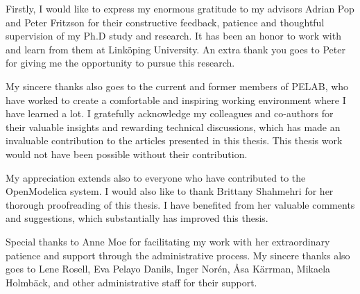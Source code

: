 

Firstly, I would like to express my enormous gratitude to my advisors Adrian Pop and Peter Fritzson for their 
constructive feedback, patience and thoughtful supervision of my Ph.D study and research. It has been an honor to work with 
and learn from them at Linköping University. An extra thank you goes to Peter for giving me the opportunity to pursue this research.

My sincere thanks also goes to the current and former members of PELAB, who have worked to create a comfortable and inspiring working environment where I have learned a lot.
I gratefully acknowledge my colleagues and co-authors for their valuable insights and rewarding technical discussions, which has made an invaluable contribution to the articles 
presented in this thesis. This thesis work would not have been possible without their contribution.

My appreciation extends also to everyone who have contributed to the OpenModelica system. I would also like to thank Brittany Shahmehri for her thorough proofreading of this thesis. 
I have benefited from her valuable comments and suggestions, which substantially has improved this thesis.

Special thanks to Anne Moe for facilitating my work with her extraordinary patience and support through the administrative process. 
My sincere thanks also goes to Lene Rosell, Eva Pelayo Danils, Inger Norén, Åsa Kärrman, Mikaela Holmbäck, and other administrative staff for their support.

